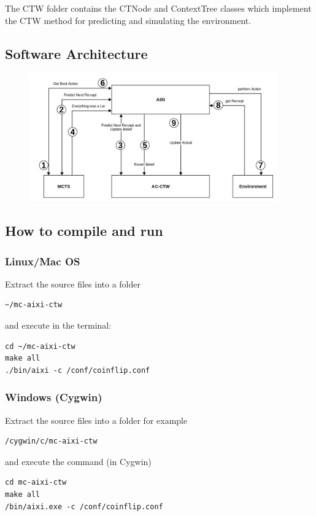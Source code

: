 \documentclass{article}
\theoremstyle{definition}
\newtheorem{primary statistics}[definition]{Primary Statistics}
\newtheorem{auxiliary statistics}[definition]{Auxiliary Statistics}
\begin{document}
The CTW folder contains the CTNode and ContextTree classes which implement the CTW method for predicting and simulating the environment.


\subsection{Software Architecture}
  \begin{figure}[h]
  \centering
\includegraphics[height=5.5cm]{soft_arch_crop}
\end{figure}


\subsection{How to compile and run}
\subsubsection*{Linux/Mac OS}
Extract the source files into a folder 
\begin{lstlisting}[style=DOS]
 ~/mc-aixi-ctw 
\end{lstlisting}
 and execute in the terminal:
 
\begin{lstlisting}[style=DOS]
cd ~/mc-aixi-ctw
make all
./bin/aixi -c /conf/coinflip.conf
\end{lstlisting}

\subsubsection*{Windows (Cygwin)}
Extract the source files into a folder for example
\begin{lstlisting}[style=DOS]
 /cygwin/c/mc-aixi-ctw 
\end{lstlisting}
and execute the command (in Cygwin)
\begin{lstlisting}[style=DOS]
cd mc-aixi-ctw
make all
/bin/aixi.exe -c /conf/coinflip.conf
\end{lstlisting}
\end{document}
